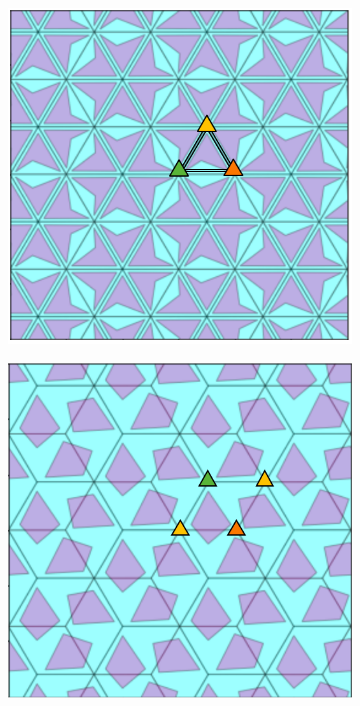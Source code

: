 \documentclass[12pt]{report}
\begin{document}
\begin{figure}[H]

  \begin{subfigure}[b]{0.32\textwidth}
    \includegraphics[width=.9\textwidth]{skicap3m1.png}
    \label{fig:f4}
  \end{subfigure}
  \begin{subfigure}[b]{0.32\textwidth}
    \includegraphics[width=.9\textwidth]{skicap3.png}
    \label{fig:f5}

\end{subfigure}
\end{figure}
\end{document}
